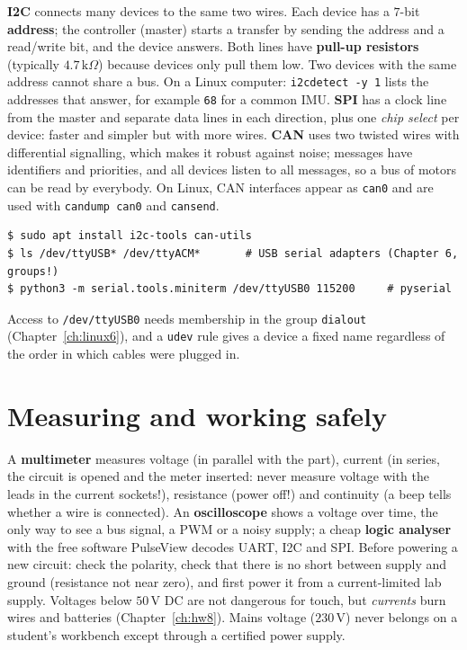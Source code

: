 \textbf{I2C} connects many devices to the same two wires. Each device has a $7$-bit \textbf{address}; the controller (master) starts a transfer by sending the address and a read/write bit, and the device answers. Both lines have \textbf{pull-up resistors} (typically $4.7\,\text{k}\Omega$) because devices only pull them low. Two devices with the same address cannot share a bus. On a Linux computer: \verb!i2cdetect -y 1! lists the addresses that answer, for example \texttt{68} for a common IMU. \textbf{SPI} has a clock line from the master and separate data lines in each direction, plus one \emph{chip select} per device: faster and simpler but with more wires. \textbf{CAN} uses two twisted wires with differential signalling, which makes it robust against noise; messages have identifiers and priorities, and all devices listen to all messages, so a bus of motors can be read by everybody. On Linux, CAN interfaces appear as \texttt{can0} and are used with \verb!candump can0! and \verb!cansend!.
\begin{verbatim}
$ sudo apt install i2c-tools can-utils
$ ls /dev/ttyUSB* /dev/ttyACM*       # USB serial adapters (Chapter 6, groups!)
$ python3 -m serial.tools.miniterm /dev/ttyUSB0 115200     # pyserial
\end{verbatim}
Access to \texttt{/dev/ttyUSB0} needs membership in the group \texttt{dialout} (Chapter~\ref{ch:linux6}), and a \texttt{udev} rule gives a device a fixed name regardless of the order in which cables were plugged in.

\section*{Measuring and working safely}
A \textbf{multimeter} measures voltage (in parallel with the part), current (in series, the circuit is opened and the meter inserted: never measure voltage with the leads in the current sockets!), resistance (power off!) and continuity (a beep tells whether a wire is connected). An \textbf{oscilloscope} shows a voltage over time, the only way to see a bus signal, a PWM or a noisy supply; a cheap \textbf{logic analyser} with the free software PulseView decodes UART, I2C and SPI. Before powering a new circuit: check the polarity, check that there is no short between supply and ground (resistance not near zero), and first power it from a current-limited lab supply. Voltages below $50$\,V DC are not dangerous for touch, but \emph{currents} burn wires and batteries (Chapter~\ref{ch:hw8}). Mains voltage ($230$\,V) never belongs on a student's workbench except through a certified power supply.

